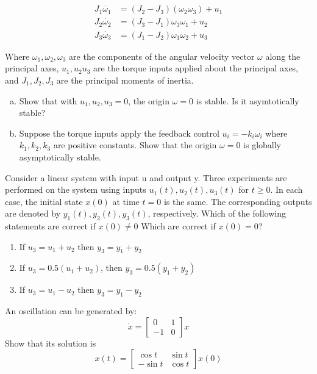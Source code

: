 \documentclass[11pt]{article}
\begin{document}
\begin{align*}
    J_1 \dot{\omega_1} &= (J_2 - J_3)(\omega_2\omega_3) + u_1\\
    J_2 \dot{\omega_2} &= (J_3 - J_1)\omega_3\omega_1 + u_2\\
    J_3 \dot{\omega_3} &= (J_1 - J_2)\omega_1\omega_2 + u_3
\end{align*}

Where $\omega_1,\omega_2,\omega_3$ are the components of the angular velocity vector $\omega$ along the principal
axes, $u_1, u_2 u_3$ are the torque inputs applied about the principal axes, and $J_1, J_2, J_3$
are the principal moments of inertia.
\begin{enumerate}[(a)]
    \item Show that with $u_1, u_2, u_3 = 0$, the origin $\omega = 0$ is stable. Is it asymtotically stable?
    \item Suppose the torque inputs apply the feedback control $u_i = -k_i\omega_i$
    where $k_1, k_2, k_3$ are positive constants. Show that the origin $\omega = 0$ is globally
    asymptotically stable.
\end{enumerate}

\soln




Consider a linear system with input u and output y. Three experiments are
performed on the system using inputs $u_1(t), u_2(t), u_3(t)$ for $t \geq 0$. In each case, the initial
state $x(0)$ at time $t = 0$ is the same. The corresponding outputs are denoted by $y_1(t), y_2(t)
, y_3(t)$, respectively. Which of the following statements are correct if $x(0) \neq 0$ Which
are correct if $x(0) = 0$?

\begin{enumerate}
    \item If $u_3 = u_1 + u_2$ then $y_3 = y_1 + y_2$
    \item If $u_3 = 0.5 (u_1 + u_2)$, then $y_3 = 0.5(y_1 + y_2)$
    \item If $u_3 = u_1 - u_2$ then $y_3 = y_1 - y_2$ 
\end{enumerate}


\soln






An oscillation can be generated by:
$$
\dot{x} = \begin{bmatrix}
    0 & 1\\-1 &0
\end{bmatrix}x
$$
Show that its solution is $$
x(t) = \begin{bmatrix}
    \cos t & \sin t \\ - \sin t & \cos t
\end{bmatrix}x(0)
$$
\end{document}
